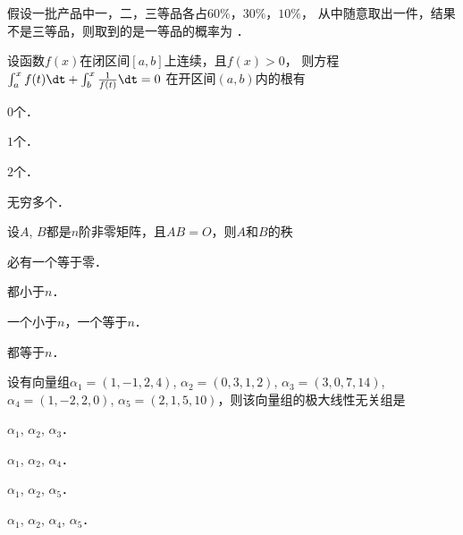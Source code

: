 \documentclass[plain,noanswer,medmath]{../../template/jnuexam}
\begin{document}














\begin{problem}
假设一批产品中一，二，三等品各占$60\%$，$30\%$，$10\%$，
从中随意取出一件，结果不是三等品，则取到的是一等品的概率为 \fillin{}．
\end{problem}






\begin{problem}
设函数$f(x)$在闭区间$[a,b]$上连续，且$f(x) > 0$，
则方程$\int_a^xf(t)\dt + \int_b^x\frac{1}{f(t)}\dt = 0$
在开区间$(a,b)$内的根有\pickout{}
\begin{abcd}
\item $0$个．      
\item $1$个．      
\item $2$个．      
\item 无穷多个．
\end{abcd}
\end{problem}


\begin{problem}
设$A$, $B$都是$n$阶非零矩阵，且$AB = O$，则$A$和$B$的秩\pickout{}
\begin{abcd}
\item 必有一个等于零．					
\item 都小于$n$．
\item 一个小于$n$，一个等于$n$．			
\item 都等于$n$．
\end{abcd}
\end{problem}


\begin{problem}
设有向量组$\alpha_1 = (1, - 1,2,4)$, $\alpha_2 = (0,3,1,2)$, $\alpha_3 = (3,0,7,14)$,
$\alpha_4 = (1, - 2,2,0)$, $\alpha_5 = (2,1,5,10)$，则该向量组的极大线性无关组是\pickout{}
\begin{abcd}
\item $\alpha_1$, $\alpha_2$, $\alpha_3$．
\item $\alpha_1$, $\alpha_2$, $\alpha_4$．
\item $\alpha_1$, $\alpha_2$, $\alpha_5$．
\item $\alpha_1$, $\alpha_2$, $\alpha_4$, $\alpha_5$．
\end{abcd}
\end{problem}
\end{document}
